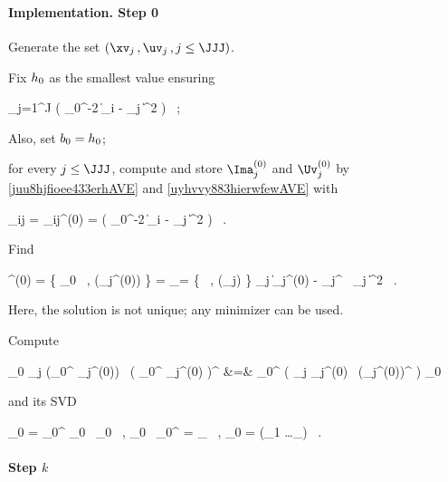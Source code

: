 \paragraph{Implementation. Step 0}
\begin{mylist}
\item
Generate the set \( (\xv_{j} \, , \uv_{j} \, , j \leq \JJJ) \).

\item
Fix \( h_{0} \) as the smallest value ensuring
\begin{EQA}[c]
	\sum_{j=1}^{J} 
	\sumi \Kern\bigl( \hiso_{0}^{-2} \| \Xv_{i} - \xv_{j} \|^{2} \bigr)
	\geq 
	\nmin
	\, ;
\end{EQA}
Also, set \( b_{0} = h_{0} \);
\item 
for every \( j \leq \JJJ \), compute and store \( \Ima_{j}^{(0)} \) and \( \Uv_{j}^{(0)} \) 
by \eqref{juu8hjfioee433erhAVE} and \eqref{uyhvvy883hierwfewAVE} with 
\begin{EQA}[c]
	\weight_{ij} 
	= 
	\weight_{ij}^{(0)}
	= 
	\Kern\bigl( \hiso_{0}^{-2} \| \Xv_{i} - \xv_{j} \|^{2} \bigr) 
	\, .
\end{EQA}
\item 
Find 
\begin{EQA}[c]
	\prmtv^{(0)} = \{ \BEDR_{0} \, , (\fclv_{j}^{(0)}) \} 
	= 
	\arginf_{\prmtv = \{ \BEDR \, , (\fclv_{j}) \}} \sum_{j} \biggl\| \Ima_{j}^{(0)} - \fclv_{j}^{\T} \BEDR \, \Uv_{j} \biggr\|^{2}
	\, .
\end{EQA} 
Here, the solution is not unique; any minimizer can be used.  

\item 
Compute
\begin{EQA}[rcl]
	\JEDR_{0}
	\eqdef
	\sum_{j} (\BEDR_{0}^{\T} {\fclv}_{j}^{(0)}) \, \bigl( \BEDR_{0}^{\T} {\fclv}_{j}^{(0)} \bigr)^{\T}
	&=&
	\BEDR_{0}^{\T} \Bigl( \sum_{j} {\fclv}_{j}^{(0)} \, ({\fclv}_{j}^{(0)})^{\T} \Bigr) \BEDR_{0}
\end{EQA}
and its SVD
\begin{EQA}[c]
	\JEDR_{0}
	=
	\PEDR_{0}^{\T} \Lambda_{0} \, \PEDR_{0}
	\, ,
	\qquad
	\PEDR_{0} \, \PEDR_{0}^{\T}
	= 
	\Id_{\dimm}
	\, ,
	\quad
	\Lambda_{0} = \diag(\lambda_{1} \geq \ldots \geq \lambda_{\dimm})
	\, .
\end{EQA}
\end{mylist}


\paragraph{Step \( k \)}

